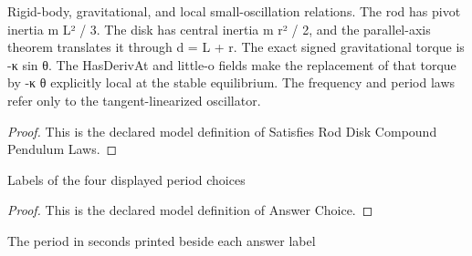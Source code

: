 \begin{definition}
  \label{def:physics:phyx-mini-0262:phyxminiproblems-problemphyxmini0262-satisfiesroddiskcompoundpendulumlaws}
  Rigid-body, gravitational, and local small-oscillation relations. The rod has pivot inertia m L² / 3. The disk has central inertia m r² / 2, and the parallel-axis theorem translates it through d = L + r. The exact signed gravitational torque is -κ sin θ. The HasDerivAt and little-o fields make the replacement of that torque by -κ θ explicitly local at the stable equilibrium. The frequency and period laws refer only to the tangent-linearized oscillator.
\end{definition}
\begin{proof}
  This is the declared model definition of Satisfies Rod Disk Compound Pendulum Laws.
\end{proof}
\begin{definition}
  \label{def:physics:phyx-mini-0262:phyxminiproblems-problemphyxmini0262-answerchoice}
  Labels of the four displayed period choices
\end{definition}
\begin{proof}
  This is the declared model definition of Answer Choice.
\end{proof}
\begin{definition}[seconds]
  \label{def:physics:phyx-mini-0262:phyxminiproblems-problemphyxmini0262-answerchoice-seconds}
  The period in seconds printed beside each answer label
\end{definition}
